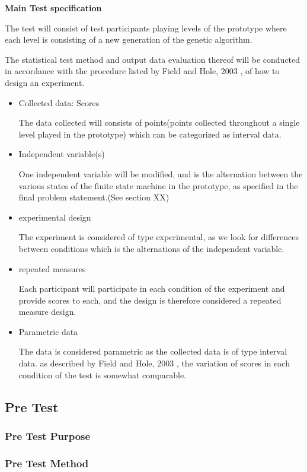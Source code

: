 \textbf{Main Test specification}

The test will consist of test participants playing levels of the prototype where each level is consisting of a new generation of the genetic algorithm.

The statistical test method and output data evaluation thereof will be conducted in accordance with the procedure listed by Field and Hole, 2003 \cite[pp. 265-277]{Field2003}, of how to design an experiment.

\begin{itemize}
\item Collected data: Scores

The data collected will consists of points(points collected throughout a single level played in the prototype) which can be categorized as interval data.
\item Independent variable(s)

One independent variable will be modified, and is the alternation between the various states of the finite state machine in the prototype, as specified in the final problem statement.(See section XX)
\item experimental design

The experiment is considered of type experimental, as we look for differences between conditions which is the alternations of the independent variable.
\item repeated measures

Each participant will participate in each condition of the experiment and provide scores to each, and the design is therefore considered a repeated measure design.
\item Parametric data

The data is considered parametric as the collected data is of type interval data. as described by Field and Hole, 2003 \cite[pp. 269]{Field2003}, the variation of scores in each condition of the test is somewhat comparable.

\end{itemize}


\subsection{Pre Test}

\subsubsection{Pre Test Purpose}
\subsubsection{Pre Test Method}
